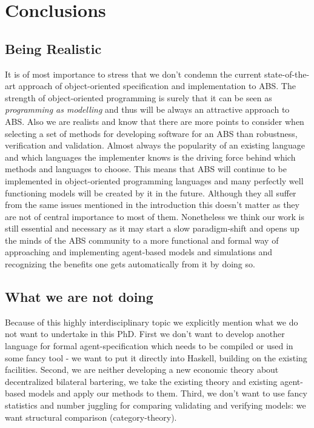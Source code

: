 \chapter{Conclusions}
\label{chap:concl}


\section{Being Realistic}
It is of most importance to stress that we don't condemn the current state-of-the-art approach of object-oriented specification and implementation to ABS. The strength of object-oriented programming is surely that it can be seen as \textit{programming as modelling} and thus will be always an attractive approach to ABS. Also we are realists and know that there are more points to consider when selecting a set of methods for developing software for an ABS than robustness, verification and validation. Almost always the popularity of an existing language and which languages the implementer knows is the driving force behind which methods and languages to choose. This means that ABS will continue to be implemented in object-oriented programming languages and many perfectly well functioning models will be created by it in the future. Although they all suffer from the same issues mentioned in the introduction this doesn't matter as they are not of central importance to most of them.
Nonetheless we think our work is still essential and necessary as it may start a slow paradigm-shift and opens up the minds of the ABS community to a more functional and formal way of approaching and implementing agent-based models and simulations and recognizing the benefits one gets automatically from it by doing so.

\section{What we are not doing}
Because of this highly interdisciplinary topic we explicitly mention what we do not want to undertake in this PhD.
First we don't want to develop another language for formal agent-specification which needs to be compiled or used in some fancy tool - we want to put it directly into Haskell, building on the existing facilities.
Second, we are neither developing a new economic theory about decentralized bilateral bartering, we take the existing theory and existing agent-based models and apply our methods to them.
Third, we don't want to use fancy statistics and number juggling for comparing validating and verifying models: we want structural comparison (category-theory).